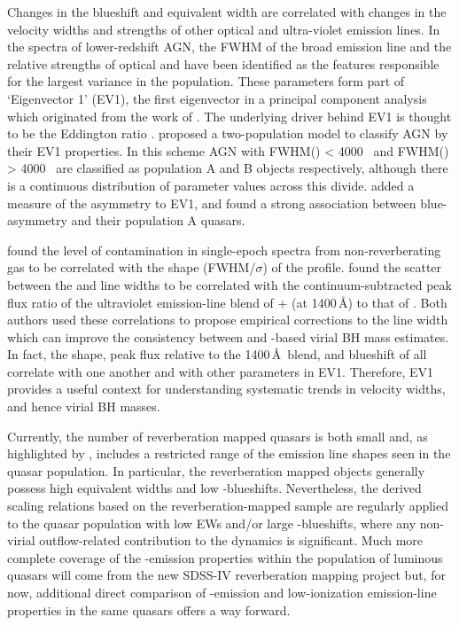 Changes in the  blueshift and equivalent width are correlated with changes in the velocity widths and strengths of other optical and ultra-violet emission lines.
In the spectra of lower-redshift AGN, the FWHM of the broad \hb emission line and the relative strengths of optical  and \hb have been identified as the features responsible for the largest variance in the population. 
These parameters form part of `Eigenvector 1' (EV1), the first eigenvector in a principal component analysis which originated from the work of \citet{boroson92}.   
The underlying driver behind EV1 is thought to be the Eddington ratio \citep[e.g.][]{sulentic00b,shen14}. 
\citet{sulentic00b} proposed a two-population model to classify AGN by their EV1 properties. 
In this scheme AGN with FWHM(\hbns) < 4000 \kms\, and FWHM(\hbns) > 4000 \kms\, are classified as population A and B objects respectively, although there is a continuous distribution of parameter values across this divide. 
\citet{sulentic07} added a measure of the  asymmetry to EV1, and found a strong association between blue-asymmetry and their population A quasars.

\citet{denney12} found the level of contamination in single-epoch spectra from non-reverberating gas to be correlated with the shape (FWHM/$\sigma$) of the  profile. 
\citet{runnoe13} found the scatter between the  and \hb line widths to be correlated with the continuum-subtracted peak flux ratio of the ultraviolet emission-line blend of + (at 1400\,\AA) to that of . 
Both authors used these correlations to propose empirical corrections to the  line width which can improve the consistency between  and \hbns-based virial BH mass estimates. 
In fact, the shape, peak flux relative to the 1400\,\AA\, blend, and blueshift of  all correlate with one another and with other parameters in EV1.
Therefore, EV1 provides a useful context for understanding systematic trends in  velocity widths, and hence virial BH masses. 

Currently, the number of reverberation mapped quasars is both small \citep[$\sim$50 quasars;][]{park13} and, as highlighted by \citet{richards11}, includes a restricted range of the  emission line shapes seen in the quasar population. 
In particular, the reverberation mapped objects generally possess high  equivalent widths and low -blueshifts. 
Nevertheless, the derived scaling relations based on the reverberation-mapped sample are regularly applied to the quasar population with low  EWs and/or large -blueshifts, where any non-virial outflow-related contribution to the dynamics is significant. 
Much more complete coverage of the -emission properties within the population of luminous quasars will come from the new SDSS-IV reverberation mapping project \citep{shen15} but, for now, additional direct comparison of -emission and low-ionization emission-line properties in the same quasars offers a way forward.


